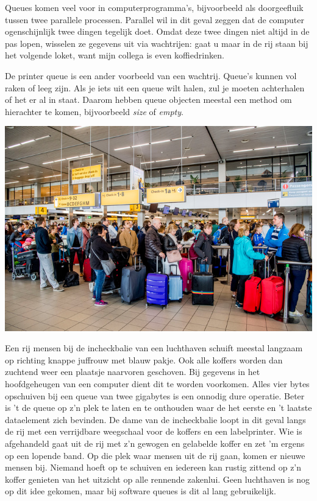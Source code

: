 \documentclass[a4paper,11pt]{article}
\begin{document}
Queues komen veel voor in computerprogramma's, bijvoorbeeld als doorgeefluik tussen twee parallele processen.
Parallel wil in dit geval zeggen dat de computer ogenschijnlijk twee dingen tegelijk doet.
Omdat deze twee dingen niet altijd in de pas lopen, wisselen ze gegevens uit via wachtrijen:
gaat u maar in de rij staan bij het volgende loket, want mijn collega is even koffiedrinken.

De printer queue is een ander voorbeeld van een wachtrij.
Queue's kunnen vol raken of leeg zijn.
Als je iets uit een queue wilt halen, zul je moeten achterhalen of het er al in staat.
Daarom hebben queue objecten meestal een method om hierachter te komen, bijvoorbeeld \emph{size} of \emph{empty}.

\includegraphics[width=15cm]{checkin}

\begin{framed}
Een rij mensen bij de incheckbalie van een luchthaven schuift meestal langzaam op richting knappe juffrouw met blauw pakje.
Ook alle koffers worden dan zuchtend weer een plaatsje naarvoren geschoven.
Bij gegevens in het hoofdgeheugen van een computer dient dit te worden voorkomen.
Alles vier bytes opschuiven bij een queue van twee gigabytes is een onnodig dure operatie.
Beter is 't de queue op z'n plek te laten en te onthouden waar de het eerste en 't laatste dataelement zich bevinden.
De dame van de incheckbalie loopt in dit geval langs de rij met een verrijdbare weegschaal voor de koffers en een labelprinter.
Wie is afgehandeld gaat uit de rij met z'n gewogen en gelabelde koffer en zet 'm ergens op een lopende band.
Op die plek waar mensen uit de rij gaan, komen er nieuwe mensen bij.
Niemand hoeft op te schuiven en iedereen kan rustig zittend op z'n koffer genieten van het uitzicht op alle rennende zakenlui.
Geen luchthaven is nog op dit idee gekomen, maar bij software queues is dit al lang gebruikelijk.
\end{framed}
\end{document}
